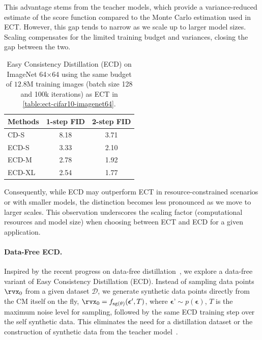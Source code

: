 This advantage stems from the teacher models, which provide a variance-reduced estimate of the score function compared to the Monte Carlo estimation used in ECT. 
%
However, this gap tends to narrow as we scale up to larger model sizes. 
Scaling compensates for the limited training budget and variances, closing the gap between the two.

\begin{table}[t]
\centering
\caption{Easy Consistency Distillation (ECD) on ImageNet 64$\times$64 using the same budget of $12.8\mathrm{M}$ training images (batch size 128 and 100k iterations) as ECT in \cref{table:ect-cifar10-imagenet64}.}
\vspace{5pt}
\label{tab:ecd}
\begin{tabular}{lcc}
\toprule
Methods & 1-step FID & 2-step FID \\
\midrule
CD-S              & 8.18  & 3.71 \\
ECD-S             & 3.33  & 2.10 \\
ECD-M             & 2.78  & 1.92 \\
ECD-XL            & 2.54  & 1.77 \\
\bottomrule
\end{tabular}
\vspace{-5pt}
\end{table}

Consequently, while ECD may outperform ECT in resource-constrained scenarios or with smaller models, the distinction becomes less pronounced as we move to larger scales. This observation underscores the scaling factor (computational resources and model size) when choosing between ECT and ECD for a given application.

\paragraph{Data-Free ECD.} Inspired by the recent progress on data-free distillation~\citep{gu2023boot,di,yin2023one,sid}, we explore a data-free variant of Easy Consistency Distillation (ECD).
Instead of sampling data points $\x_0$ from a given dataset $\mathcal{D}$, we generate synthetic data points directly from the CM itself on the fly, $\x_0 = f_{\operatorname{sg}(\theta)}(\boldsymbol{\epsilon}', T)$, where $\boldsymbol{\epsilon}’ \sim p(\boldsymbol{\epsilon})$, $T$ is the maximum noise level for sampling, followed by the same ECD training step over the self synthetic data. This eliminates the need for a distillation dataset or the construction of synthetic data from the teacher model~\citep{Luhman2021KnowledgeDI,geng2024one,dfno}.

